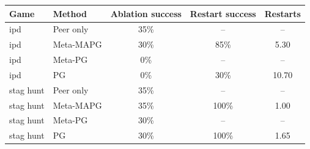 \begin{tabular}{llccc}\toprule
Game & Method & Ablation success & Restart success & Restarts \\\midrule
ipd & Peer only & 35\% & -- & -- \\
ipd & Meta-MAPG & 30\% & 85\% & 5.30 \\
ipd & Meta-PG & 0\% & -- & -- \\
ipd & PG & 0\% & 30\% & 10.70 \\
stag hunt & Peer only & 35\% & -- & -- \\
stag hunt & Meta-MAPG & 35\% & 100\% & 1.00 \\
stag hunt & Meta-PG & 30\% & -- & -- \\
stag hunt & PG & 30\% & 100\% & 1.65 \\
\bottomrule
\end{tabular}
